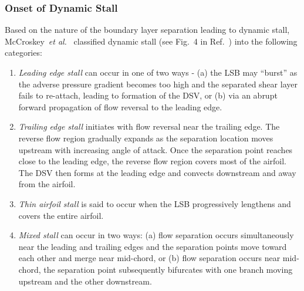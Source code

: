 \documentclass[aps,pra,preprint,groupedaddress]{revtex4-1}
\newcommand{\etal}{{\em et al.}}
\renewcommand{\=}[1]{\stackrel{#1}{=}} %
\begin{document}
\subsubsection{Onset of Dynamic Stall}
\label{sec:stallMechanisms}
%
Based on the nature of the boundary layer separation leading to dynamic stall,
McCroskey~\etal~\cite{mccroskey1981} classified dynamic stall (see
Fig.~4 in Ref.~\cite{mccroskey1981}) into the following categories:
\begin{enumerate}

  \item {\em Leading edge stall} can occur in one of two ways - (a) the LSB may
    ``burst'' as the adverse pressure gradient becomes too high and the
    separated shear layer fails to re-attach, leading to formation of the DSV,
    or (b) via an abrupt forward propagation of flow reversal to the leading
    edge.

  \item {\em Trailing edge stall} initiates with flow reversal near the
    trailing edge. The reverse flow region gradually expands as the separation
    location moves upstream with increasing angle of attack. Once the
    separation point reaches close to the leading edge, the reverse flow region
    covers most of the airfoil. The DSV then forms at the leading edge and
    convects downstream and away from the airfoil.

  \item {\em Thin airfoil stall} is said to occur when the LSB progressively
    lengthens and covers the entire airfoil.

  \item {\em Mixed stall} can occur in two ways: (a) flow separation occurs
    simultaneously near the leading and trailing edges and the separation
    points move toward each other and merge near mid-chord, or (b) flow
    separation occurs near mid-chord, the separation point subsequently
    bifurcates with one branch moving upstream and the other downstream.
\end{enumerate}
\clearpage
\end{document}
